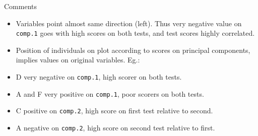 \documentclass[ignorenonframetext,]{beamer}
\begin{document}
\begin{frame}[fragile]{Comments}
\protect\hypertarget{comments-28}{}

\begin{itemize}
\item
  Variables point almost same direction (left). Thus very negative value
  on \texttt{comp.1} goes with high scores on both tests, and test
  scores highly correlated.
\item
  Position of individuals on plot according to scores on principal
  components, implies values on original variables. Eg.:
\item
  D very negative on \texttt{comp.1}, high scorer on both tests.
\item
  A and F very positive on \texttt{comp.1}, poor scorers on both tests.
\item
  C positive on \texttt{comp.2}, high score on first test relative to
  second.
\item
  A negative on \texttt{comp.2}, high score on second test relative to
  first.
\end{itemize}

\end{frame}
\end{document}
